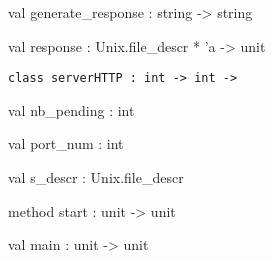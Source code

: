 \documentclass[11pt]{article}
\begin{document}
\label{val:Server.generate-underscoreresponse}\begin{ocamldoccode}
val generate_response : string -> string
\end{ocamldoccode}




\label{val:Server.response}\begin{ocamldoccode}
val response : Unix.file_descr * 'a -> unit
\end{ocamldoccode}




\begin{ocamldoccode}
{\tt{class serverHTTP : }}{\tt{int -> int -> }}\end{ocamldoccode}
\label{class:Server.serverHTTP}

\begin{ocamldocobjectend}


\label{val:Server.serverHTTP.nb-underscorepending}\begin{ocamldoccode}
val nb_pending : int
\end{ocamldoccode}


\label{val:Server.serverHTTP.port-underscorenum}\begin{ocamldoccode}
val port_num : int
\end{ocamldoccode}


\label{val:Server.serverHTTP.s-underscoredescr}\begin{ocamldoccode}
val s_descr : Unix.file_descr
\end{ocamldoccode}


\label{method:Server.serverHTTP.start}\begin{ocamldoccode}
method start : unit -> unit
\end{ocamldoccode}
\end{ocamldocobjectend}






\label{val:Server.main}\begin{ocamldoccode}
val main : unit -> unit
\end{ocamldoccode}
\end{document}
